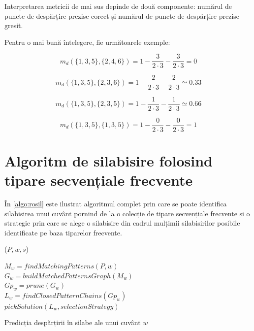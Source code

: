 Interpretarea metricii de mai sus depinde de două componente: numărul de puncte de despărțire prezise corect și numărul de puncte de despărțire prezise gresit.

\begin{ex}
Pentru o mai bună întelegere, fie următoarele exemple:

\begin{equation}
m_d(\{1,3,5\}, \{2,4,6\}) = 1- \frac{3}{2 \cdot 3} - \frac{3}{2 \cdot 3} = 0 
\end{equation}

\begin{equation}
m_d(\{1,3,5\}, \{2,3,6\}) = 1- \frac{2}{2 \cdot 3} - \frac{2}{2 \cdot 3} \simeq 0.33 
\end{equation}

\begin{equation}
m_d(\{1,3,5\}, \{2,3,5\}) = 1- \frac{1}{2 \cdot 3} - \frac{1}{2 \cdot 3} \simeq 0.66 
\end{equation}


\begin{equation}
m_d(\{1,3,5\}, \{1,3,5\}) = 1 - \frac{0}{2 \cdot 3} - \frac{0}{2 \cdot 3} = 1 
\end{equation}


\end{ex} 

\section{Algoritm de silabisire folosind tipare secvențiale frecvente}
În \ref{algo:rosil} este ilustrat algoritmul complet prin care se poate identifica silabisirea unui cuvânt pornind de la o colecție de tipare secvențiale frecvente și o strategie prin care se alege o silabisire din cadrul mulțimii silabisirilor posibile identificate pe baza tiparelor frecvente.
\begin{algorithm}
\SetAlgoLined
{}

\ppg($P, w, s$) \\

$M_w = findMatchingPatterns(P,w)$ \\
$G_w = buildMatchedPatternsGraph(M_w)$ \\
$Gp_w = prune(G_w)$ \\
$L_w = findClosedPatternChains(Gp_w)$ \\
\KwRet $pickSolution(L_w, selectionStrategy)$
\vspace{.1cm}

\caption{Predicția despărțirii în silabe ale unui cuvânt $w$}
\label{algo:rosil}
\end{algorithm}

